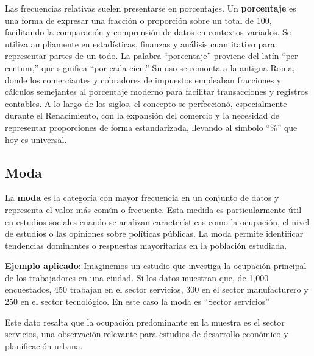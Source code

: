 \documentclass[
  letterpaper,
  DIV=11,
  numbers=noendperiod]{scrreprt}
\begin{document}
Las frecuencias relativas suelen presentarse en porcentajes. Un
\textbf{porcentaje} es una forma de expresar una fracción o proporción
sobre un total de 100, facilitando la comparación y comprensión de datos
en contextos variados. Se utiliza ampliamente en estadísticas, finanzas
y análisis cuantitativo para representar partes de un todo. La palabra
``porcentaje'' proviene del latín ``per centum,'' que significa ``por
cada cien.'' Su uso se remonta a la antigua Roma, donde los comerciantes
y cobradores de impuestos empleaban fracciones y cálculos semejantes al
porcentaje moderno para facilitar transacciones y registros contables. A
lo largo de los siglos, el concepto se perfeccionó, especialmente
durante el Renacimiento, con la expansión del comercio y la necesidad de
representar proporciones de forma estandarizada, llevando al símbolo
``\%'' que hoy es universal.

\subsection{Moda}\label{moda}

La \textbf{moda} es la categoría con mayor frecuencia en un conjunto de
datos y representa el valor más común o frecuente. Esta medida es
particularmente útil en estudios sociales cuando se analizan
características como la ocupación, el nivel de estudios o las opiniones
sobre políticas públicas. La moda permite identificar tendencias
dominantes o respuestas mayoritarias en la población estudiada.

\begin{tcolorbox}[enhanced jigsaw, toprule=.15mm, opacitybacktitle=0.6, toptitle=1mm, arc=.35mm, left=2mm, title=\textcolor{quarto-callout-tip-color}{\faLightbulb}\hspace{0.5em}{Tip}, titlerule=0mm, leftrule=.75mm, rightrule=.15mm, coltitle=black, bottomtitle=1mm, bottomrule=.15mm, colframe=quarto-callout-tip-color-frame, opacityback=0, colback=white, breakable, colbacktitle=quarto-callout-tip-color!10!white]

\textbf{Ejemplo aplicado}: Imaginemos un estudio que investiga la
ocupación principal de los trabajadores en una ciudad. Si los datos
muestran que, de 1,000 encuestados, 450 trabajan en el sector servicios,
300 en el sector manufacturero y 250 en el sector tecnológico. En este
caso la moda es ``Sector servicios''

Este dato resalta que la ocupación predominante en la muestra es el
sector servicios, una observación relevante para estudios de desarrollo
económico y planificación urbana.

\end{tcolorbox}
\end{document}

